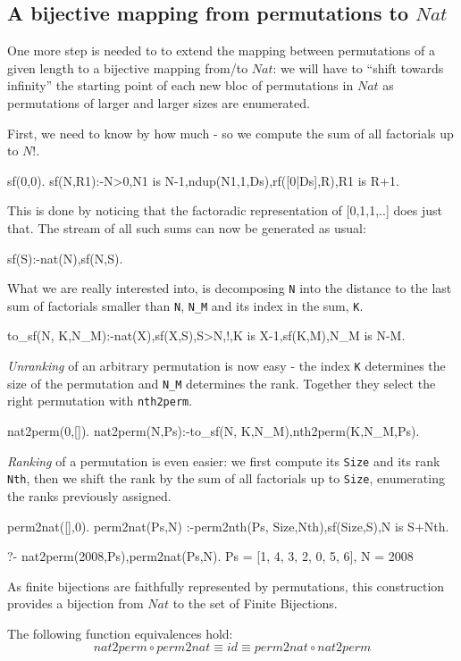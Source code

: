 \documentclass[]{INCLUDES/llncs}
\begin{document}
\subsection{A bijective mapping from permutations to $Nat$}
One more step is needed to to extend the mapping between permutations of a
given length to a bijective mapping from/to $Nat$: we will have to ``shift
towards infinity'' the starting point of each new bloc of permutations in $Nat$
as permutations of larger and larger sizes are enumerated.

First, we need to know by how much - so we compute the sum of
all factorials up to $N!$.
\begin{code}
sf(0,0).
sf(N,R1):-N>0,N1 is N-1,ndup(N1,1,Ds),rf([0|Ds],R),R1 is R+1.
\end{code}
This is done by noticing that the factoradic representation of
[0,1,1,..] does just that. The stream of all such sums can now
be generated as usual:
\begin{code}
sf(S):-nat(N),sf(N,S).
\end{code}
What we are really interested into, is decomposing {\tt N} into
the distance to the
last sum of factorials smaller than {\tt N}, {\tt N\_M}
and its index in the sum, {\tt K}.
\begin{code}
to_sf(N, K,N_M):-nat(X),sf(X,S),S>N,!,K is X-1,sf(K,M),N_M is N-M.
\end{code}
{\em Unranking} of an arbitrary permutation is now easy - the index {\tt K}
determines the size of the permutation and {\tt N\_M} determines
the rank. Together they select the right permutation with {\tt nth2perm}.
\begin{code}
nat2perm(0,[]).
nat2perm(N,Ps):-to_sf(N, K,N_M),nth2perm(K,N_M,Ps).
\end{code}
{\em Ranking} of a permutation is even easier: we first compute
its {\tt Size} and its rank {\tt Nth}, then we shift the rank by 
the sum of all factorials up to {\tt Size}, enumerating the
ranks previously assigned.
\begin{code}
perm2nat([],0).
perm2nat(Ps,N) :-perm2nth(Ps, Size,Nth),sf(Size,S),N is S+Nth.
\end{code}
\begin{codex}
?- nat2perm(2008,Ps),perm2nat(Ps,N).
Ps = [1, 4, 3, 2, 0, 5, 6],
N = 2008
\end{codex}
As finite bijections are faithfully represented by permutations,
this construction provides a bijection from $Nat$ to 
the set of Finite Bijections.
\begin{prop}
The following function equivalences hold:
\begin{equation}
nat2perm \circ perm2nat \equiv id \equiv perm2nat \circ nat2perm
\end{equation}
\end{prop}
\end{document}

